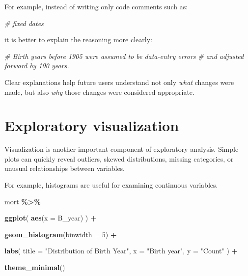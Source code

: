 \documentclass[
  11pt,
  oneside]{book}
\newenvironment{Shaded}{\begin{snugshade}}{\end{snugshade}}
\newcommand{\AttributeTok}[1]{\textcolor[rgb]{0.13,0.29,0.53}{#1}}
\newcommand{\CommentTok}[1]{\textcolor[rgb]{0.56,0.35,0.01}{\textit{#1}}}
\newcommand{\DecValTok}[1]{\textcolor[rgb]{0.00,0.00,0.81}{#1}}
\newcommand{\FunctionTok}[1]{\textcolor[rgb]{0.13,0.29,0.53}{\textbf{#1}}}
\newcommand{\NormalTok}[1]{#1}
\newcommand{\SpecialCharTok}[1]{\textcolor[rgb]{0.81,0.36,0.00}{\textbf{#1}}}
\newcommand{\StringTok}[1]{\textcolor[rgb]{0.31,0.60,0.02}{#1}}
\begin{document}
For example, instead of writing only code comments such as:

\begin{Shaded}
\begin{Highlighting}[]
\CommentTok{\# fixed dates}
\end{Highlighting}
\end{Shaded}

it is better to explain the reasoning more clearly:

\begin{Shaded}
\begin{Highlighting}[]
\CommentTok{\# Birth years before 1905 were assumed to be data{-}entry errors}
\CommentTok{\# and adjusted forward by 100 years.}
\end{Highlighting}
\end{Shaded}

Clear explanations help future users understand not only \emph{what} changes were made, but also \emph{why} those changes were considered appropriate.

\section{Exploratory visualization}\label{exploratory-visualization}

Visualization is another important component of exploratory analysis. Simple plots can quickly reveal outliers, skewed distributions, missing categories, or unusual relationships between variables.

For example, histograms are useful for examining continuous variables.

\begin{Shaded}
\begin{Highlighting}[]
\NormalTok{mort }\SpecialCharTok{\%\textgreater{}\%}
  
  \FunctionTok{ggplot}\NormalTok{(}
    \FunctionTok{aes}\NormalTok{(}\AttributeTok{x =}\NormalTok{ B\_year)}
\NormalTok{  ) }\SpecialCharTok{+}
  
  \FunctionTok{geom\_histogram}\NormalTok{(}\AttributeTok{binwidth =} \DecValTok{5}\NormalTok{) }\SpecialCharTok{+}
  
  \FunctionTok{labs}\NormalTok{(}
    \AttributeTok{title =} \StringTok{"Distribution of Birth Year"}\NormalTok{,}
    \AttributeTok{x =} \StringTok{"Birth year"}\NormalTok{,}
    \AttributeTok{y =} \StringTok{"Count"}
\NormalTok{  ) }\SpecialCharTok{+}
  
  \FunctionTok{theme\_minimal}\NormalTok{()}
\end{Highlighting}
\end{Shaded}
\end{document}
